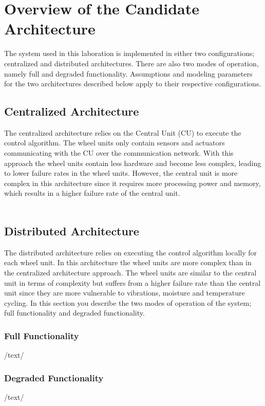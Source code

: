 
\newpage
\section{Overview of the Candidate Architecture}
The system used in this laboration is implemented in either two configurations; centralized and distributed architectures. There are also two modes of operation, namely full and degraded functionality. Assumptions and modeling parameters for the two architectures described below apply to their respective configurations.

\subsection{Centralized Architecture}
The centralized architecture relies on the Central Unit (CU) to execute the control algorithm. The wheel units only contain sensors and actuators communicating with the CU over the communication network. With this approach the wheel units contain less hardware and become less complex, leading to lower failure rates in the wheel units. However, the central unit is more complex in this architecture since it requires more processing power and memory, which results in a higher failure rate of the central unit.\\
\\
\subsection{Distributed Architecture}
The distributed architecture relies on executing the control algorithm locally for each wheel unit. In this architecture the wheel units are more complex than in the centralized architecture approach. The wheel units are similar to the central unit in terms of complexity but suffers from a higher failure rate than the central unit since they are more vulnerable to vibrations, moisture and temperature cycling.
In this section you describe the two modes of operation of the system; full functionality and degraded functionality.
\subsubsection{Full Functionality}
/text/
\subsubsection{Degraded Functionality}
/text/
